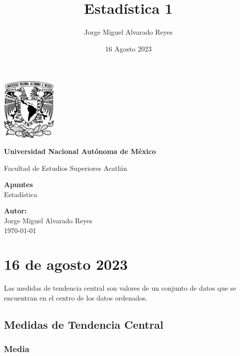 \documentclass{article}
\title{Estadística 1}
\author{Jorge Miguel Alvarado Reyes}
\date{16 Agosto 2023}
\begin{document}
\begin{titlepage}
    \begin{center}
        \includegraphics[width=0.2\textwidth]{unam.png}
        \vspace*{.5cm}

        \LARGE
        \textbf{Universidad Nacional Autónoma de México}

        \vspace{0.5cm}
        \LARGE
        Facultad de Estudios Superiores Acatlán

        \vspace{2cm}

        \textbf{Apuntes} \\
        Estadística

        \vfill

        \vspace{1cm}

        \textbf{\large Autor:} \\
        Jorge Miguel Alvarado Reyes \\
        \vspace{.5cm}
        \normalsize \today

    \end{center}
\end{titlepage}
\newpage

\tableofcontents

\newpage

\section{16 de agosto 2023} %

Las medidas de tendencia central son valores de un conjunto de datos que se encuentran en el centro de los datos ordenados.

\subsection{Medidas de Tendencia Central} %

\subsubsection{Media}
\end{document}
